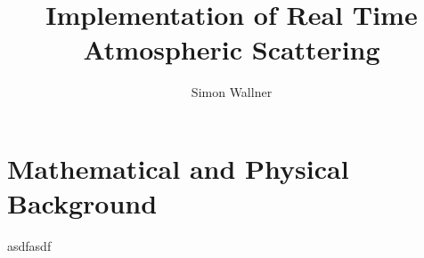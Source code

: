\documentclass[12pt,a4paper]{scrartcl}
\author{Simon Wallner}
\title{Implementation of Real Time Atmospheric Scattering}
\begin{document}
\maketitle
\section{Mathematical and Physical Background}
asdfasdf
\end{document}
